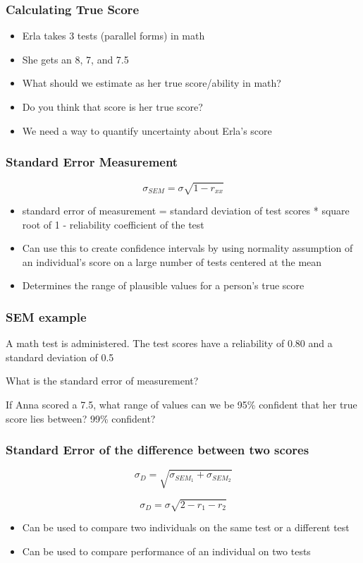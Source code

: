 \documentclass[dvipsnames]{beamer}\usepackage[]{graphicx}\usepackage[]{color}
\begin{document}
\begin{frame}
\frametitle{Calculating True Score}
\begin{itemize}
  \item Erla takes 3 tests (parallel forms) in math
  \item She gets an 8, 7, and 7.5
  \item What should we estimate as her true score/ability in math?
  \item Do you think that score is her true score?
  \item<2-> \textcolor{wared}{We need a way to quantify uncertainty about Erla's score}
\end{itemize}
\end{frame}

\begin{frame}
\frametitle{Standard Error Measurement}
$$\sigma_{SEM} = \sigma\sqrt{1 - r_{xx}}$$
\begin{itemize}
\item standard error of measurement = standard deviation of test scores * square root of 1 - reliability coefficient of the test
  \item<2->Can use this to create confidence intervals by using normality assumption of an individual's score on a large number of tests centered at the mean
  \item<2-> Determines the range of plausible values for a person's true score
\end{itemize}
\end{frame}

\begin{frame}
\frametitle{SEM example}

A math test is administered. The test scores have a reliability of 0.80 and a standard deviation of 0.5

\vspace{1cm}
What is the standard error of measurement?

\vspace{1cm}
If Anna scored a 7.5, what range of values can we be 95\% confident that her true score lies between? 99\% confident?
\end{frame}

\begin{frame}
\frametitle{Standard Error of the difference between two scores}
$$\sigma_D = \sqrt{\sigma_{SEM_1} + \sigma_{SEM_2}} $$

$$\sigma_D = \sigma\sqrt{2 - r_1 - r_2} $$

\begin{itemize}
  \item Can be used to compare two individuals on the same test or a different test
  \item Can be used to compare performance of an individual on two tests
\end{itemize}
\end{frame}
\end{document}
